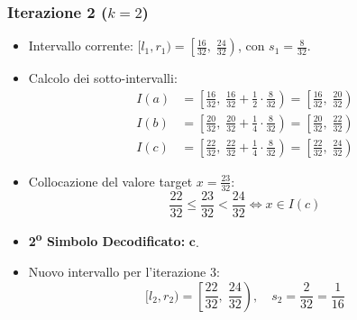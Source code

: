 \subsubsection*{Iterazione 2 ($k = 2$)}
\begin{itemize}
  \item Intervallo corrente: $[l_1, r_1) = \left[ \frac{16}{32}, \; \frac{24}{32} \right)$, con $s_1 = \frac{8}{32}$.
  \item Calcolo dei sotto-intervalli:
  \begin{align}
    I(a) &= \left[ \frac{16}{32}, \; \frac{16}{32} + \frac{1}{2} \cdot \frac{8}{32} \right) = \left[ \frac{16}{32}, \; \frac{20}{32} \right) \\
    I(b) &= \left[ \frac{20}{32}, \; \frac{20}{32} + \frac{1}{4} \cdot \frac{8}{32} \right) = \left[ \frac{20}{32}, \; \frac{22}{32} \right) \\
    I(c) &= \left[ \frac{22}{32}, \; \frac{22}{32} + \frac{1}{4} \cdot \frac{8}{32} \right) = \left[ \frac{22}{32}, \; \frac{24}{32} \right)
  \end{align}
  \item Collocazione del valore target $x = \frac{23}{32}$:
  \begin{equation}
    \frac{22}{32} \le \frac{23}{32} < \frac{24}{32} \iff x \in I(c)
  \end{equation}
  \item \textbf{2\textsuperscript{o} Simbolo Decodificato:} $\mathbf{c}$.
  \item Nuovo intervallo per l'iterazione 3:
  \begin{equation}
    [l_2, r_2) = \left[ \frac{22}{32}, \; \frac{24}{32} \right), \quad s_2 = \frac{2}{32} = \frac{1}{16}
  \end{equation}
\end{itemize}

